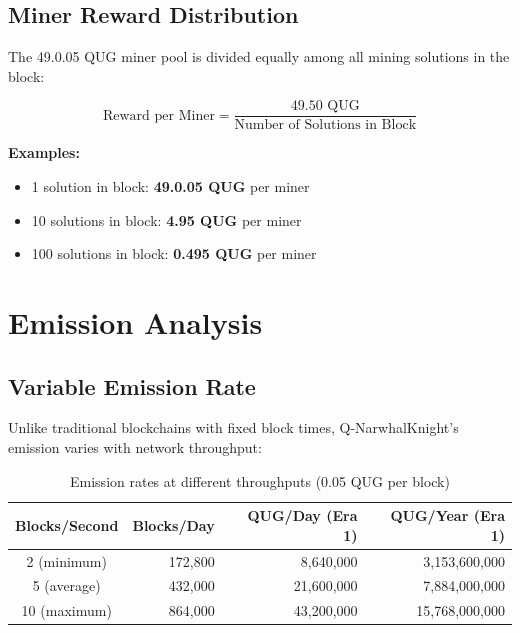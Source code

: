 \documentclass[11pt,a4paper]{article}
\begin{document}
\subsection{Miner Reward Distribution}

The 49.0.05 QUG miner pool is divided equally among all mining solutions in the block:

\begin{equation}
\text{Reward per Miner} = \frac{49.50 \text{ QUG}}{\text{Number of Solutions in Block}}
\end{equation}

\textbf{Examples:}
\begin{itemize}
    \item 1 solution in block: \textbf{49.0.05 QUG} per miner
    \item 10 solutions in block: \textbf{4.95 QUG} per miner
    \item 100 solutions in block: \textbf{0.495 QUG} per miner
\end{itemize}

\section{Emission Analysis}

\subsection{Variable Emission Rate}

Unlike traditional blockchains with fixed block times, Q-NarwhalKnight's emission varies with network throughput:

\begin{table}[h]
\centering
\begin{tabular}{crrr}
\toprule
\textbf{Blocks/Second} & \textbf{Blocks/Day} & \textbf{QUG/Day (Era 1)} & \textbf{QUG/Year (Era 1)} \\
\midrule
2 (minimum) & 172,800 & 8,640,000 & 3,153,600,000 \\
5 (average) & 432,000 & 21,600,000 & 7,884,000,000 \\
10 (maximum) & 864,000 & 43,200,000 & 15,768,000,000 \\
\bottomrule
\end{tabular}
\caption{Emission rates at different throughputs (0.05 QUG per block)}
\end{table}
\end{document}

